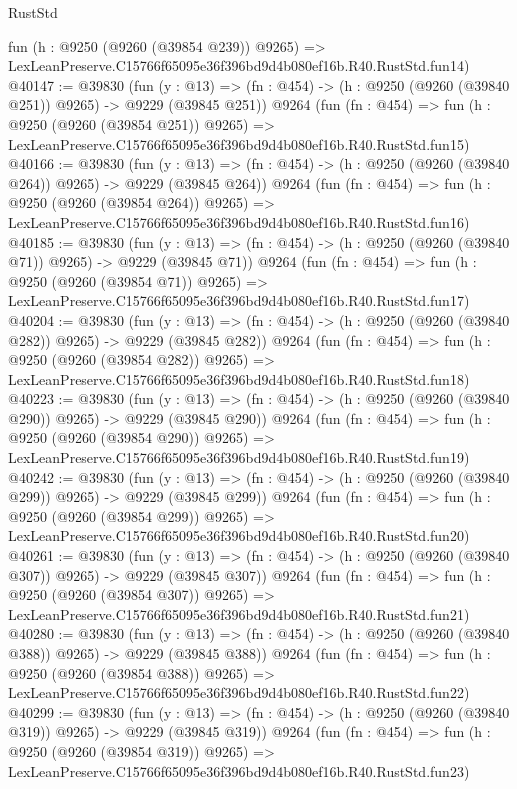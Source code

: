 \begin{lexlean}{RustStd}
\begin{coremodule}
    fun (h : @9250 (@9260 (@39854 @239)) @9265) =>
    LexLeanPreserve.C15766f65095e36f396bd9d4b080ef16b.R40.RustStd.fun14)
@40147 := @39830
    (fun (y : @13) => (fn : @454) -> (h : @9250 (@9260 (@39840 @251)) @9265) -> @9229 (@39845 @251))
    @9264
    (fun (fn : @454) =>
    fun (h : @9250 (@9260 (@39854 @251)) @9265) =>
    LexLeanPreserve.C15766f65095e36f396bd9d4b080ef16b.R40.RustStd.fun15)
@40166 := @39830
    (fun (y : @13) => (fn : @454) -> (h : @9250 (@9260 (@39840 @264)) @9265) -> @9229 (@39845 @264))
    @9264
    (fun (fn : @454) =>
    fun (h : @9250 (@9260 (@39854 @264)) @9265) =>
    LexLeanPreserve.C15766f65095e36f396bd9d4b080ef16b.R40.RustStd.fun16)
@40185 := @39830
    (fun (y : @13) => (fn : @454) -> (h : @9250 (@9260 (@39840 @71)) @9265) -> @9229 (@39845 @71))
    @9264
    (fun (fn : @454) =>
    fun (h : @9250 (@9260 (@39854 @71)) @9265) =>
    LexLeanPreserve.C15766f65095e36f396bd9d4b080ef16b.R40.RustStd.fun17)
@40204 := @39830
    (fun (y : @13) => (fn : @454) -> (h : @9250 (@9260 (@39840 @282)) @9265) -> @9229 (@39845 @282))
    @9264
    (fun (fn : @454) =>
    fun (h : @9250 (@9260 (@39854 @282)) @9265) =>
    LexLeanPreserve.C15766f65095e36f396bd9d4b080ef16b.R40.RustStd.fun18)
@40223 := @39830
    (fun (y : @13) => (fn : @454) -> (h : @9250 (@9260 (@39840 @290)) @9265) -> @9229 (@39845 @290))
    @9264
    (fun (fn : @454) =>
    fun (h : @9250 (@9260 (@39854 @290)) @9265) =>
    LexLeanPreserve.C15766f65095e36f396bd9d4b080ef16b.R40.RustStd.fun19)
@40242 := @39830
    (fun (y : @13) => (fn : @454) -> (h : @9250 (@9260 (@39840 @299)) @9265) -> @9229 (@39845 @299))
    @9264
    (fun (fn : @454) =>
    fun (h : @9250 (@9260 (@39854 @299)) @9265) =>
    LexLeanPreserve.C15766f65095e36f396bd9d4b080ef16b.R40.RustStd.fun20)
@40261 := @39830
    (fun (y : @13) => (fn : @454) -> (h : @9250 (@9260 (@39840 @307)) @9265) -> @9229 (@39845 @307))
    @9264
    (fun (fn : @454) =>
    fun (h : @9250 (@9260 (@39854 @307)) @9265) =>
    LexLeanPreserve.C15766f65095e36f396bd9d4b080ef16b.R40.RustStd.fun21)
@40280 := @39830
    (fun (y : @13) => (fn : @454) -> (h : @9250 (@9260 (@39840 @388)) @9265) -> @9229 (@39845 @388))
    @9264
    (fun (fn : @454) =>
    fun (h : @9250 (@9260 (@39854 @388)) @9265) =>
    LexLeanPreserve.C15766f65095e36f396bd9d4b080ef16b.R40.RustStd.fun22)
@40299 := @39830
    (fun (y : @13) => (fn : @454) -> (h : @9250 (@9260 (@39840 @319)) @9265) -> @9229 (@39845 @319))
    @9264
    (fun (fn : @454) =>
    fun (h : @9250 (@9260 (@39854 @319)) @9265) =>
    LexLeanPreserve.C15766f65095e36f396bd9d4b080ef16b.R40.RustStd.fun23)

\end{coremodule}
\end{lexlean}
